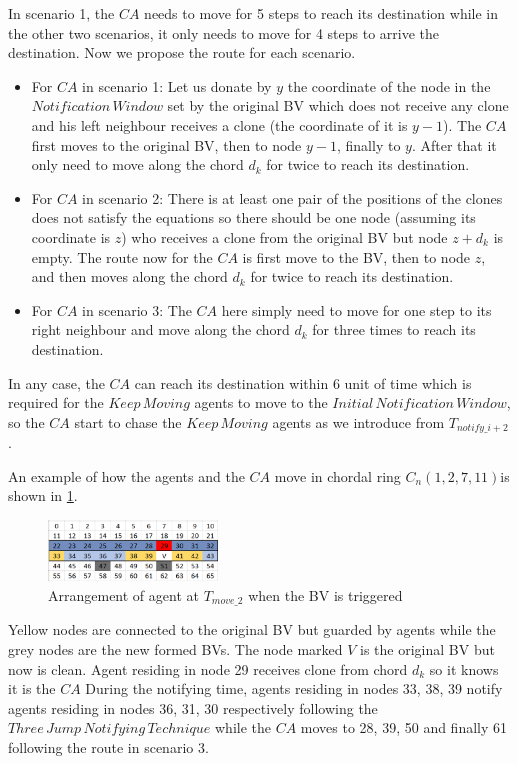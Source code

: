 \documentclass[conference]{IEEEtran}
\begin{document}
In scenario 1, the $CA$ needs to move for 5 steps to reach its destination while in the other two scenarios, it only needs to move for 4 steps to arrive the destination. Now we propose the route for each scenario.
\begin{itemize}
\item For $CA$ in scenario 1: Let us donate by $y$ the coordinate of the node in the $Notification\,Window$ set by the original BV which does not receive any clone and his left neighbour receives a clone (the coordinate of it is $y-1$). The $CA$ first moves to the original BV, then to node $y-1$, finally to $y$. After that it only need to move along the chord $d_k$ for twice to reach its destination.
\item For $CA$ in scenario 2: There is at least one pair of the positions of the clones does not satisfy the equations so there should be one node (assuming its coordinate is $z$) who receives a clone from the original BV but node $z+d_k$ is empty. The route now for the $CA$ is first move to the BV, then to node $z$, and then moves along the chord $d_k$ for twice to reach its destination.
\item For $CA$ in scenario 3: The $CA$ here simply need to move for one step to its right neighbour and move along the chord $d_k$ for three times to reach its destination.
\end{itemize}


In any case, the $CA$ can reach its destination within 6 unit of time which is required for the $Keep\,Moving$ agents to move to the $Initial\,Notification\,Window$, so the $CA$ start to chase the $Keep\,Moving$ agents as we introduce from $T_{notify\_{i+2}}$. 

An example of how the agents and the $CA$ move in chordal ring $C_n(1, 2, 7, 11)$is shown in \ref{fig:T29}. 
\begin{figure}[H]
  \centering  
  \includegraphics[width=0.4\textwidth]{figures/T29.png}
  \caption{Arrangement of agent at $T_{move\_2}$ when the BV is triggered}\label{fig:T29}
\end{figure}

Yellow nodes are connected to the original BV but guarded by agents while the grey nodes are the new formed BVs. The node marked $V$ is the original BV but now is clean. Agent residing in node 29 receives clone from chord $d_k$ so it knows it is the $CA$ During the notifying time, agents residing in nodes 33, 38, 39 notify agents residing in nodes 36, 31, 30 respectively following the $Three\,Jump\,Notifying\,Technique$ while the $CA$ moves to 28, 39, 50 and finally 61 following the route in scenario 3.
\end{document}
